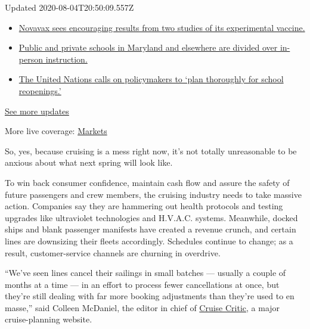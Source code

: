 Updated 2020-08-04T20:50:09.557Z

\begin{itemize}
\tightlist
\item
  \href{https://www.nytimes3xbfgragh.onion/2020/08/04/world/coronavirus-cases.html?action=click\&pgtype=Article\&state=default\&region=MAIN_CONTENT_1\&context=storylines_live_updates\#link-1228a480}{Novavax
  sees encouraging results from two studies of its experimental
  vaccine.}
\item
  \href{https://www.nytimes3xbfgragh.onion/2020/08/04/world/coronavirus-cases.html?action=click\&pgtype=Article\&state=default\&region=MAIN_CONTENT_1\&context=storylines_live_updates\#link-4825b93}{Public
  and private schools in Maryland and elsewhere are divided over
  in-person instruction.}
\item
  \href{https://www.nytimes3xbfgragh.onion/2020/08/04/world/coronavirus-cases.html?action=click\&pgtype=Article\&state=default\&region=MAIN_CONTENT_1\&context=storylines_live_updates\#link-50f7386d}{The
  United Nations calls on policymakers to `plan thoroughly for school
  reopenings.'}
\end{itemize}

\href{https://www.nytimes3xbfgragh.onion/2020/08/04/world/coronavirus-cases.html?action=click\&pgtype=Article\&state=default\&region=MAIN_CONTENT_1\&context=storylines_live_updates}{See
more updates}

More live coverage:
\href{https://www.nytimes3xbfgragh.onion/live/2020/08/04/business/stock-market-today-coronavirus?action=click\&pgtype=Article\&state=default\&region=MAIN_CONTENT_1\&context=storylines_live_updates}{Markets}

So, yes, because cruising is a mess right now, it's not totally
unreasonable to be anxious about what next spring will look like.

To win back consumer confidence, maintain cash flow and assure the
safety of future passengers and crew members, the cruising industry
needs to take massive action. Companies say they are hammering out
health protocols and testing upgrades like ultraviolet technologies and
H.V.A.C. systems. Meanwhile, docked ships and blank passenger manifests
have created a revenue crunch, and certain lines are downsizing their
fleets accordingly. Schedules continue to change; as a result,
customer-service channels are churning in overdrive.

``We've seen lines cancel their sailings in small batches --- usually a
couple of months at a time --- in an effort to process fewer
cancellations at once, but they're still dealing with far more booking
adjustments than they're used to en masse,'' said Colleen McDaniel, the
editor in chief of \href{https://www.cruisecritic.com/}{Cruise Critic},
a major cruise-planning website.

